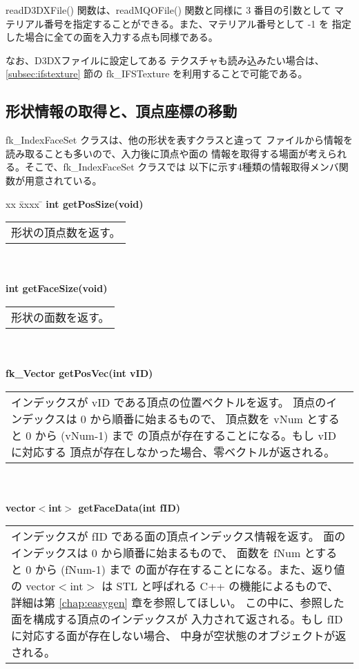 readD3DXFile() 関数は、readMQOFile() 関数と同様に 3 番目の引数として
マテリアル番号を指定することができる。また、マテリアル番号として -1 を
指定した場合に全ての面を入力する点も同様である。

なお、D3DXファイルに設定してある
テクスチャも読み込みたい場合は、\ref{subsec:ifstexture} 節の
fk\_IFSTexture を利用することで可能である。

\subsection{形状情報の取得と、頂点座標の移動}
fk\_IndexFaceSet クラスは、他の形状を表すクラスと違って
ファイルから情報を読み取ることも多いので、入力後に頂点や面の
情報を取得する場面が考えられる。そこで、fk\_IndexFaceSet クラスでは
以下に示す4種類の情報取得メンバ関数が用意されている。
\begin{tabbing}
xx \= xxxx \= \kill
\> \textbf{int getPosSize(void)} \\
	\> \> \begin{tabular}{p{15cm}}
		形状の頂点数を返す。
	\end{tabular} \\ \\

\> \textbf{int getFaceSize(void)} \\
	\> \> \begin{tabular}{p{15cm}}
		形状の面数を返す。
	\end{tabular} \\ \\

\> \textbf{fk\_Vector getPosVec(int vID)} \\
	\> \> \begin{tabular}{p{15cm}}
		インデックスが vID である頂点の位置ベクトルを返す。
		頂点のインデックスは 0 から順番に始まるもので、
		頂点数を vNum とすると 0 から (vNum-1) まで
		の頂点が存在することになる。もし vID に対応する
		頂点が存在しなかった場合、零ベクトルが返される。
	\end{tabular} \\ \\

\> \textbf{vector\(<\)int\(>\) getFaceData(int fID)} \\
	\> \> \begin{tabular}{p{15cm}}
		インデックスが fID である面の頂点インデックス情報を返す。
		面のインデックスは 0 から順番に始まるもので、
		面数を fNum とすると 0 から (fNum-1) まで
		の面が存在することになる。また、返り値の
		vector\(<\)int\(>\) は STL と呼ばれる C++ の機能によるもので、
		詳細は第 \ref{chap:easygen} 章を参照してほしい。
		この中に、参照した面を構成する頂点のインデックスが
		入力されて返される。もし fID に対応する面が存在しない場合、
		中身が空状態のオブジェクトが返される。
	\end{tabular}
\end{tabbing}
